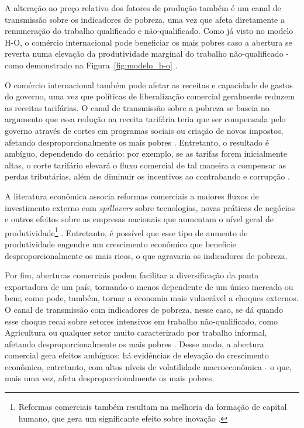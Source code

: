 A alteração no preço relativo dos fatores de produção também é um canal de transmissão sobre os indicadores de pobreza, uma vez que afeta diretamente a remuneração do trabalho qualificado e não-qualificado. Como já visto no modelo H-O, o comércio internacional pode beneficiar os mais pobres caso a abertura se reverta numa elevação da produtividade marginal do trabalho não-qualificado - como demonstrado na Figura~\ref{fig:modelo_h-o} \cite{bannisterthugge01}.

O comércio internacional também pode afetar as receitas e capacidade de gastos do governo, uma vez que políticas de liberalização comercial geralmente reduzem as receitas tarifárias. O canal de transmissão sobre a pobreza se baseia no argumento que essa redução na receita tarifária teria que ser compensada pelo governo através de cortes em programas sociais ou criação de novos impostos, afetando desproporcionalmente os mais pobres \cite{bannisterthugge01}. Entretanto, o resultado é ambíguo, dependendo do cenário: por exemplo, se as tarifas forem inicialmente altas, o corte tarifário elevará o fluxo comercial de tal maneira a compensar as perdas tributárias, além de diminuir os incentivos ao contrabando e corrupção \cite{bannisterthugge01}.

A literatura econômica associa reformas comerciais a maiores fluxos de investimento externo com \textit{spillovers} sobre tecnologias, novas práticas de negócios e outros efeitos sobre as empresas nacionais que aumentam o nível geral de produtividade\footnote{Reformas comerciais também resultam na melhoria da formação de capital humano, que gera um significante efeito sobre inovação \cite{bannisterthugge01}.} \cite{bannisterthugge01}. Entretanto, é possível que esse tipo de aumento de produtividade engendre um crescimento econômico que beneficie desproporcionalmente os mais ricos, o que agravaria os indicadores de pobreza.

Por fim, aberturas comerciais podem facilitar a diversificação da pauta exportadora de um país, tornando-o menos dependente de um único mercado ou bem; como pode, também, tornar a economia mais vulnerável a choques externos. O canal de transmissão com indicadores de pobreza, nesse caso, se dá quando esse choque recai sobre setores intensivos em trabalho não-qualificado, como Agricultura ou qualquer setor muito caracterizado por trabalho informal, afetando desproporcionalmente os mais pobres \cite{bannisterthugge01}. Desse modo, a abertura comercial gera efeitos ambíguos: há evidências de elevação do crescimento econômico, entretanto, com altos níveis de volatilidade macroeconômica - o que, mais uma vez, afeta desproporcionalmente os mais pobres.

